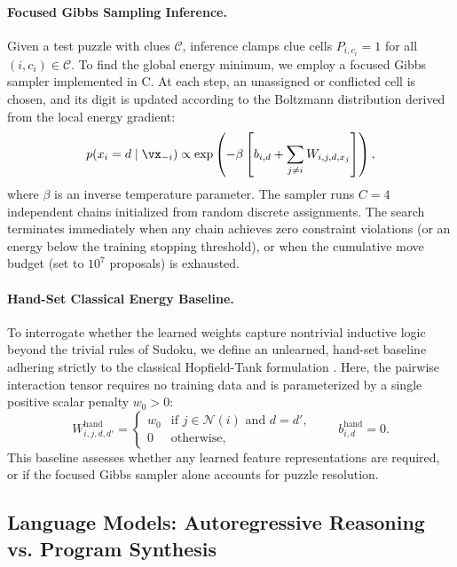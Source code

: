 \documentclass{article} %
\begin{document}
\paragraph{Focused Gibbs Sampling Inference.}
Given a test puzzle with clues $\mathcal{C}$, inference clamps clue cells $P_{i, c_i} = 1$ for all $(i, c_i) \in \mathcal{C}$. To find the global energy minimum, we employ a focused Gibbs sampler implemented in C. At each step, an unassigned or conflicted cell is chosen, and its digit is updated according to the Boltzmann distribution derived from the local energy gradient:
\begin{equation}
p(x_i = d \mid \vx_{-i}) \propto \exp\left( - \beta \left[ b_{i, d} + \sum_{j \neq i} W_{i, j, d, x_j} \right] \right),
\end{equation}
where $\beta$ is an inverse temperature parameter. The sampler runs $C = 4$ independent chains initialized from random discrete assignments. The search terminates immediately when any chain achieves zero constraint violations (or an energy below the training stopping threshold), or when the cumulative move budget (set to $10^7$ proposals) is exhausted.

\paragraph{Hand-Set Classical Energy Baseline.}
To interrogate whether the learned weights capture nontrivial inductive logic beyond the trivial rules of Sudoku, we define an unlearned, hand-set baseline adhering strictly to the classical Hopfield-Tank formulation \citep{hopfield1985neural}. Here, the pairwise interaction tensor requires no training data and is parameterized by a single positive scalar penalty $w_0 > 0$:
\begin{equation}
W^{\text{hand}}_{i, j, d, d'} = \begin{cases} 
w_0 & \text{if } j \in \mathcal{N}(i) \text{ and } d = d', \\
0 & \text{otherwise},
\end{cases}
\qquad b^{\text{hand}}_{i, d} = 0.
\end{equation}
This baseline assesses whether any learned feature representations are required, or if the focused Gibbs sampler alone accounts for puzzle resolution.

\subsection{Language Models: Autoregressive Reasoning vs. Program Synthesis}
\end{document}

